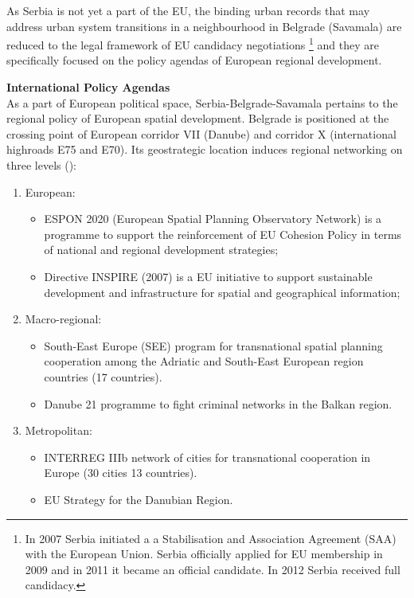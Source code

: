 \documentclass[11pt]{report}
\begin{document}
As Serbia is not yet a part of the EU, the binding urban records that may address urban system transitions in a neighbourhood in Belgrade (Savamala) are reduced to the legal framework of EU candidacy negotiations
\footnote{In 2007 Serbia initiated a a Stabilisation and Association Agreement (SAA) with the European Union. Serbia officially applied for EU membership in 2009 and in 2011 it became an official candidate. In 2012 Serbia received full candidacy.}
and they are specifically focused on the policy agendas of European regional development.

\textbf{International Policy Agendas}
\\
As a part of European political space, Serbia-Belgrade-Savamala pertains to the regional policy of European spatial development. Belgrade is positioned at the crossing point of European corridor VII (Danube) and corridor X (international highroads E75 and E70). Its geostrategic location induces regional networking on three levels (\href{Stuper}{\citealt{stupar_aleksandra_recreating_2004}}):

\begin{enumerate}
\item European:

\begin{itemize}
\item ESPON 2020 (European Spatial Planning Observatory Network) is a programme to support the reinforcement of EU Cohesion Policy in terms of national and regional development strategies;
\item Directive INSPIRE (2007) is a EU initiative to support sustainable development and infrastructure for spatial and geographical information; 
\end{itemize}

\item Macro-regional:

\begin{itemize}
\item South-East Europe (SEE) program for transnational spatial planning cooperation among the Adriatic and South-East European region countries (17 countries).
\item Danube 21 programme to fight criminal networks in the Balkan region.
\end{itemize}

\item Metropolitan:

\begin{itemize}
\item INTERREG IIIb network of cities for transnational cooperation in Europe (30 cities 13 countries).
\item EU Strategy for the Danubian Region.
\end{itemize}
\end{enumerate}
\end{document}
